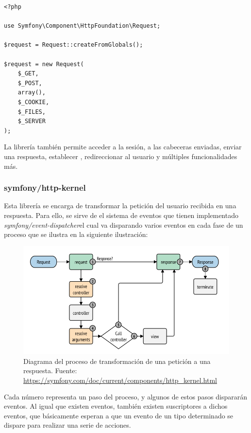 \begin{verbatim}
<?php

use Symfony\Component\HttpFoundation\Request;

$request = Request::createFromGlobals();

$request = new Request(
    $_GET,
    $_POST,
    array(),
    $_COOKIE,
    $_FILES,
    $_SERVER
);
\end{verbatim}

La librería también permite acceder a la sesión, a las cabeceras enviadas,
enviar una respuesta, establecer , redireccionar
al usuario y múltiples funcionalidades más.

\subsubsection{symfony/http-kernel}
Esta librería se encarga de transformar la petición del usuario recibida en
una respuesta. Para ello, se sirve de el sistema de eventos que tienen
implementado \textemdash \textit{symfony/event-dispatcher}\textemdash el cual
va disparando varios eventos en cada fase de un proceso que se ilustra en la
siguiente ilustración:

\begin{figure}[h]
    \center
    \includegraphics[scale=0.3]{img/http-workflow}
    \caption{Diagrama del proceso de transformación de una petición a una
        respuesta. Fuente:
        \url{https://symfony.com/doc/current/components/http_kernel.html}}
\end{figure}

Cada número representa un paso del proceso, y algunos de estos pasos dispararán
eventos. Al igual que existen eventos, también existen suscriptores a dichos
eventos, que básicamente esperan a que un evento de un tipo determinado se
dispare para realizar una serie de acciones.

